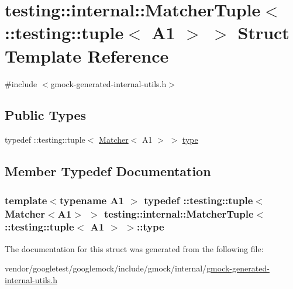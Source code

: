 \hypertarget{structtesting_1_1internal_1_1MatcherTuple_3_01_1_1testing_1_1tuple_3_01A1_01_4_01_4}{}\section{testing\+:\+:internal\+:\+:Matcher\+Tuple$<$ \+:\+:testing\+:\+:tuple$<$ A1 $>$ $>$ Struct Template Reference}
\label{structtesting_1_1internal_1_1MatcherTuple_3_01_1_1testing_1_1tuple_3_01A1_01_4_01_4}


{\ttfamily \#include $<$gmock-\/generated-\/internal-\/utils.\+h$>$}

\subsection*{Public Types}
\begin{DoxyCompactItemize}
\item 
typedef \+::testing\+::tuple$<$ \hyperlink{classtesting_1_1Matcher}{Matcher}$<$ A1 $>$ $>$ \hyperlink{structtesting_1_1internal_1_1MatcherTuple_3_01_1_1testing_1_1tuple_3_01A1_01_4_01_4_a8463ac100366f7e8b6ad1035e42ec4b0}{type}
\end{DoxyCompactItemize}


\subsection{Member Typedef Documentation}
\subsubsection[{\texorpdfstring{type}{type}}]{\setlength{\rightskip}{0pt plus 5cm}template$<$typename A1 $>$ typedef \+::testing\+::tuple$<${\bf Matcher}$<$A1$>$ $>$ {\bf testing\+::internal\+::\+Matcher\+Tuple}$<$ \+::testing\+::tuple$<$ A1 $>$ $>$\+::{\bf type}}\hypertarget{structtesting_1_1internal_1_1MatcherTuple_3_01_1_1testing_1_1tuple_3_01A1_01_4_01_4_a8463ac100366f7e8b6ad1035e42ec4b0}{}\label{structtesting_1_1internal_1_1MatcherTuple_3_01_1_1testing_1_1tuple_3_01A1_01_4_01_4_a8463ac100366f7e8b6ad1035e42ec4b0}


The documentation for this struct was generated from the following file\+:\begin{DoxyCompactItemize}
\item 
vendor/googletest/googlemock/include/gmock/internal/\hyperlink{gmock-generated-internal-utils_8h}{gmock-\/generated-\/internal-\/utils.\+h}\end{DoxyCompactItemize}
